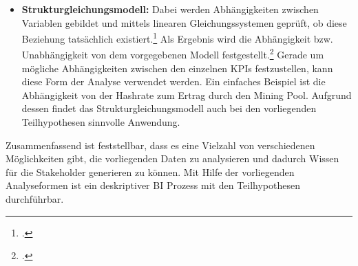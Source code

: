 \begin{itemize}
\begin{itemize}
        messen und dadurch bestimmen, ob eine Trennung existiert und wie stark diese
        ist.\footcite[Cf.][p. 98]{bihani2014comparative} Die Anwendung dieser Analyse liegt klassischerweise im Verständnis
        von demographischen Faktoren beim Kauf von Produkten.\footcite[Cf.][p. 98]{bihani2014comparative} Interessant ist diese
        Form der Analyse für die Interpretation der identischen \acp{KPI} aus verschiedenen Rechenzentren. Gerade die Analyse von
        Unterschieden von Daten zwischen Rechenzentren ermöglicht die Generierung von neuem Wissen und ist somit im Bereich
        \ac{BI} von unmittelbarer Relevanz. Die Anwendung der Diskriminanzfunktionsanalyse ist daher für alle Teilhypothesen
        sinnvoll, sobald mehr als ein Rechenzentrum betrachtet wird.
        \item \textbf{Strukturgleichungsmodell: }Dabei werden Abhängigkeiten zwischen Variablen gebildet und mittels linearen
        Gleichungssystemen geprüft, ob diese Beziehung tatsächlich existiert.\footcite[Cf.][pp. 98]{bihani2014comparative} Als
        Ergebnis wird die Abhängigkeit bzw. Unabhängigkeit von dem vorgegebenen Modell
        festgestellt.\footcite[Cf.][pp. 98]{bihani2014comparative}
        Gerade um mögliche Abhängigkeiten zwischen den einzelnen \acp{KPI} festzustellen, kann diese Form der Analyse verwendet
        werden. Ein einfaches Beispiel ist die Abhängigkeit von der Hashrate zum Ertrag durch den Mining Pool. Aufgrund dessen
        findet das Strukturgleichungsmodell auch bei den vorliegenden Teilhypothesen sinnvolle Anwendung.
    \end{itemize}
    Zusammenfassend ist feststellbar, dass es eine Vielzahl von verschiedenen Möglichkeiten gibt, die vorliegenden Daten zu
    analysieren und dadurch Wissen für die Stakeholder generieren zu können. Mit Hilfe der vorliegenden Analyseformen ist
    ein deskriptiver \ac{BI} Prozess mit den Teilhypothesen durchführbar.


\end{itemize}
